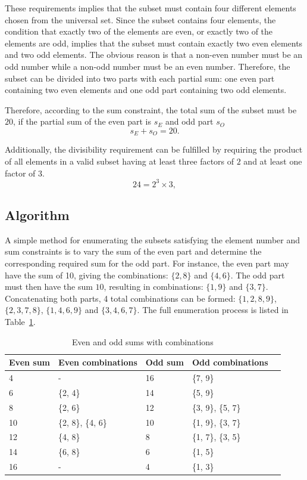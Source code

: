 \documentclass[11pt,a4paper]{article}
\begin{document}
These requirements implies that the subset must contain four different elements chosen from the universal set. Since the subset contains four elements, the condition that exactly two of the elements are even, or exactly two of the elements are odd, implies that the subset must contain exactly two even elements and two odd elements. The obvious reason is that a non-even number must be an odd number while a non-odd number must be an even number. Therefore, the subset can be divided into two parts with each partial sum: one even part containing two even elements and one odd part containing two odd elements.

Therefore, according to the sum constraint, the total sum of the subset must be $20$, if the partial sum of the even part is $s_E$ and odd part $s_O$
\[
s_E + s_O = 20.
\]

Additionally, the divisibility requirement can be fulfilled by requiring the product of all elements in a valid subset having at least three factors of $2$ and at least one factor of $3$.
\[
24 = 2^3 \times 3,
\]

\subsection*{Algorithm}

A simple method for enumerating the subsets satisfying the element number and sum constraints is to vary the sum of the even part and determine the corresponding required sum for the odd part. For instance, the even part may have the sum of 10, giving the combinations: $\{2, 8\}$ and $\{4, 6\}$. The odd part must then have the sum $10$, resulting in combinations: $\{1, 9\}$ and $\{3, 7\}$. Concatenating both parts, 4 total combinations can be formed: $\{1, 2, 8, 9\}$, $\{2, 3, 7, 8\}$, $\{1, 4, 6, 9\}$ and $\{3, 4, 6, 7\}$. The full enumeration process is listed in Table~\ref{tab:sums}.

\begin{table}[h]
\centering
\caption{Even and odd sums with combinations}
\label{tab:sums}
\begin{tabular}{lllll}
\toprule
Even sum & Even combinations & Odd sum & Odd combinations \\
\midrule
4 & - & 16 & \{7, 9\}\\
6 & \{2, 4\} & 14 & \{5, 9\}\\
8 & \{2, 6\} & 12 & \{3, 9\}, \{5, 7\}\\
10 & \{2, 8\}, \{4, 6\} & 10 & \{1, 9\}, \{3, 7\}\\
12 & \{4, 8\} & 8 & \{1, 7\}, \{3, 5\}\\
14 & \{6, 8\} & 6 & \{1, 5\}\\
16 & - & 4 & \{1, 3\}\\
\bottomrule
\end{tabular}
\end{table}
\end{document}

